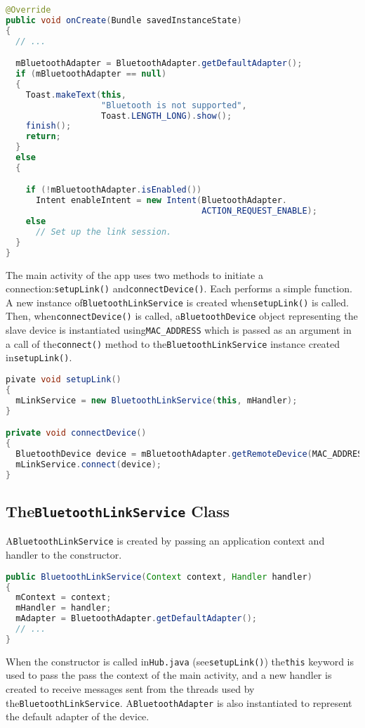 \documentclass[11pt, a4paper, oneside, english]{scrbook}
\begin{document}
\begin{lstlisting}[language=Java, numbers=none]
@Override
public void onCreate(Bundle savedInstanceState)
{
  // ...

  mBluetoothAdapter = BluetoothAdapter.getDefaultAdapter();
  if (mBluetoothAdapter == null)
  {
    Toast.makeText(this,
                   "Bluetooth is not supported",
                   Toast.LENGTH_LONG).show();
    finish();
    return;
  }
  else
  {

    if (!mBluetoothAdapter.isEnabled())
      Intent enableIntent = new Intent(BluetoothAdapter.
                                       ACTION_REQUEST_ENABLE);
    else
      // Set up the link session.
  }
}
\end{lstlisting}
The main activity of the app uses two methods to initiate a connection:\lstinline{setupLink()} and\lstinline{connectDevice()}. Each performs a simple function. A new instance of\lstinline{BluetoothLinkService} is created when\lstinline{setupLink()} is called. Then, when\lstinline{connectDevice()} is called, a\lstinline{BluetoothDevice} object representing the slave device is instantiated using\lstinline{MAC_ADDRESS} which is passed as an argument in a call of the\lstinline{connect()} method to the\lstinline{BluetoothLinkService} instance created in\lstinline{setupLink()}.
\begin{lstlisting}[language=Java,
                   numbers=none]
pivate void setupLink()
{ 
  mLinkService = new BluetoothLinkService(this, mHandler);
}

private void connectDevice()
{
  BluetoothDevice device = mBluetoothAdapter.getRemoteDevice(MAC_ADDRESS);
  mLinkService.connect(device);
}
\end{lstlisting}
\subsection{The\lstinline{BluetoothLinkService} Class} %
\label{sub:bls}
A\lstinline{BluetoothLinkService} is created by passing an application context and handler to the constructor.
\begin{lstlisting}[language=Java, numbers=none]
public BluetoothLinkService(Context context, Handler handler)
{
  mContext = context;
  mHandler = handler;
  mAdapter = BluetoothAdapter.getDefaultAdapter();
  // ...
}
\end{lstlisting}
When the constructor is called in\lstinline{Hub.java} (see\lstinline{setupLink()}) the\lstinline{this} keyword is used to pass the pass the context of the main activity, and a new handler is created to receive messages sent from the threads used by the\lstinline{BluetoothLinkService}. A\lstinline{BluetoothAdapter} is also instantiated to represent the default adapter of the device.
\end{document}
